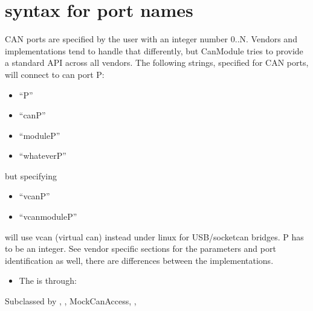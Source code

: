 \documentclass[a4paper,10pt,english]{sphinxmanual}
\begin{document}
\section{syntax for port names}
\label{\detokenize{canports:syntax-for-port-names}}
CAN ports are specified by the user with an integer number 0..N.
Vendors and implementations tend to handle that differently, but CanModule tries to provide a
standard API across all vendors. The following strings, specified for CAN ports, will connect
to can port P:
\begin{itemize}
\item {} 
“P”

\item {} 
“canP”

\item {} 
“moduleP”

\item {} 
“whateverP”

\end{itemize}

but specifying
\begin{itemize}
\item {} 
“vcanP”

\item {} 
“vcanmoduleP”

\end{itemize}

will use vcan (virtual can) instead under linux for USB/socketcan bridges. P has to be an integer.
See vendor specific sections for the parameters and port identification as well, there are differences between
the implementations.
\begin{itemize}
\item {} 
The  is through:

\end{itemize}

\begin{fulllineitems}
\label{\detokenize{canports:_CPPv4N9CanModule10CCanAccessE}}%
\pysigstartmultiline
{}%
\pysigstopmultiline
Subclassed by {\hyperref[\detokenize{classestracing:classAnaCanScan}]{}}, {\hyperref[\detokenize{classestracing:classCSockCanScan}]{}}, MockCanAccess, {\hyperref[\detokenize{vendors/peak:classPKCanScan}]{}}, {\hyperref[\detokenize{classestracing:classSTCanScan}]{}}

\end{fulllineitems}
\end{document}
